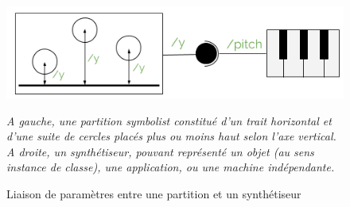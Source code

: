 \begin{figure}[H]
	\centering
	\includegraphics[keepaspectratio=true, width=\textwidth]{StructurationRecherche/i/linkingParameters.png}
	\caption{Liaison de paramètres entre une partition et un synthétiseur}
	\label{fig:linkingParameters}
	\small
	\textit{ A gauche, une partition \textit{symbolist} constitué d'un trait horizontal et d'une suite de cercles placés plus ou moins haut selon l'axe vertical. A droite, un synthétiseur, pouvant représenté un objet (au sens instance de classe), une application, ou une machine indépendante. }
\end{figure}

